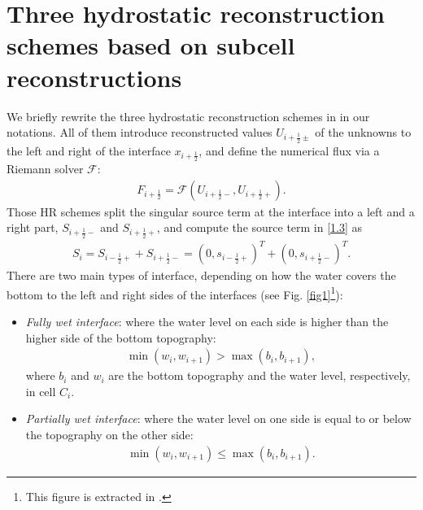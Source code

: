 \documentclass[11pt,a4paper,center,notitlepage]{article}
\numberwithin{equation}{section}
\begin{document}
\section{Three hydrostatic reconstruction schemes based on subcell reconstructions}
We briefly rewrite the three hydrostatic reconstruction schemes in \cite{Chen2017} in our notations. All of them introduce reconstructed values $U_{i+\frac{1}{2}\pm}$ of the unknowns to the left and right of the interface $x_{i+\frac{1}{2}}$, and define the numerical flux via a Riemann solver $\mathcal{F}$: 
\begin{align}
{F_{i + \frac{1}{2}}} = \mathcal{F} \left( {{U_{i + \frac{1}{2} - }},{U_{i + \frac{1}{2} + }}} \right).
\end{align}
Those HR schemes split the singular source term at the interface into a left and a right part, $S_{i+\frac{1}{2}-}$ and $S_{i+\frac{1}{2}+}$, and compute the source term in \eqref{1.3} as 
\begin{align}
{S_i} = {S_{i - \frac{1}{2} + }} + {S_{i + \frac{1}{2} - }} = {\left( {0,{s_{i - \frac{1}{2} + }}} \right)^T} + {\left( {0,{s_{i + \frac{1}{2} - }}} \right)^T}.
\end{align}
There are two main types of interface, depending on how the water covers the bottom to the left and right sides of the interfaces (see Fig. \ref{fig1}\footnote{This figure is extracted in \cite[p. 761]{Chen2017}.}):
\begin{itemize}
\item \textit{Fully wet interface}: where the water level on each side is higher than the higher side of the bottom topography:
\begin{align}
\min \left( {{w_i},{w_{i + 1}}} \right) > \max \left( {{b_i},{b_{i + 1}}} \right),
\end{align}
where $b_i$ and $w_i$ are the bottom topography and the water level, respectively, in cell $C_i$. 
\item \textit{Partially wet interface}: where the water level on one side is equal to or below the topography on the other side:
\begin{align}
\label{3.4}
\min \left( {{w_i},{w_{i + 1}}} \right) \le \max \left( {{b_i},{b_{i + 1}}} \right).
\end{align}
\end{itemize}
\end{document}
